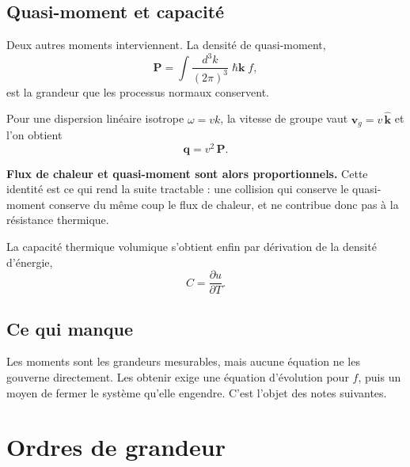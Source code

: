 \documentclass[11pt,a4paper]{article}
\begin{document}
\subsection{Quasi-moment et capacité}

Deux autres moments interviennent. La densité de quasi-moment,
\[ \mathbf{P} = \int \frac{d^3k}{(2\pi)^3}\; \hbar\mathbf{k}\; f , \]
est la grandeur que les processus normaux conservent.

Pour une dispersion linéaire isotrope $\omega = vk$, la vitesse de groupe vaut
$\mathbf{v}_g = v\,\hat{\mathbf{k}}$ et l'on obtient
\[ \mathbf{q} = v^2\,\mathbf{P} . \]

\textbf{Flux de chaleur et quasi-moment sont alors proportionnels.} Cette identité est ce qui rend
la suite tractable : une collision qui conserve le quasi-moment conserve du même coup le flux de
chaleur, et ne contribue donc pas à la résistance thermique.

La capacité thermique volumique s'obtient enfin par dérivation de la densité d'énergie,
\[ C = \frac{\partial u}{\partial T} . \]

\subsection{Ce qui manque}

Les moments sont les grandeurs mesurables, mais aucune équation ne les gouverne directement. Les
obtenir exige une équation d'évolution pour $f$, puis un moyen de fermer le système qu'elle engendre.
C'est l'objet des notes suivantes.

\section{Ordres de grandeur}
\end{document}
